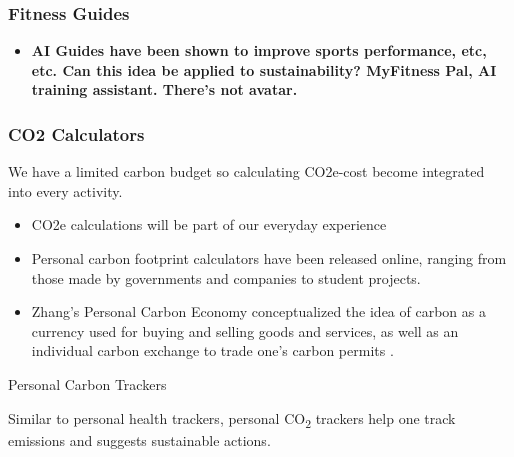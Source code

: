 \documentclass[
  letterpaper,
  DIV=11,
  numbers=noendperiod]{scrartcl}
\providecommand{\tightlist}{%
  \setlength{\itemsep}{0pt}\setlength{\parskip}{0pt}}\usepackage{longtable,booktabs,array}
\begin{document}
\subsubsection{Fitness Guides}\label{fitness-guides}

\begin{itemize}
\tightlist
\item
  \textbf{AI Guides have been shown to improve sports performance, etc,
  etc. Can this idea be applied to sustainability? MyFitness Pal, AI
  training assistant. There's not avatar.}
\end{itemize}

\subsubsection{CO2 Calculators}\label{co2-calculators}

We have a limited carbon budget so calculating CO2e-cost become
integrated into every activity.

\begin{itemize}
\item
  CO2e calculations will be part of our everyday experience
\item
  Personal carbon footprint calculators have been released online,
  ranging from those made by governments and companies to student
  projects.
\item
  Zhang's Personal Carbon Economy conceptualized the idea of carbon as a
  currency used for buying and selling goods and services, as well as an
  individual carbon exchange to trade one's carbon permits
  \citep{zhangPersonalCarbonEconomy2018}.
\end{itemize}

Personal Carbon Trackers

Similar to personal health trackers, personal CO\textsubscript{2}
trackers help one track emissions and suggests sustainable actions.
\end{document}
